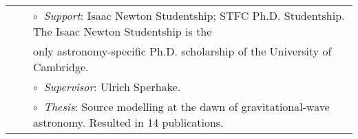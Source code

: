 \documentclass[letterpaper]{moderncv}
\begin{document}
\vspace{0.2cm}
\vspace{-0.1cm}
\begin{tabular}{rcl}
&\hspace{0.4cm} &$\circ\;\;${\textit{Support}}: Isaac Newton Studentship; STFC Ph.D. Studentship. The
Isaac Newton Studentship is the \\&\hspace{0.4cm} &  
\hspace{0.4cm}only astronomy-specific Ph.D. scholarship of the University of Cambridge.\\
&\hspace{0.4cm} &$\circ\;\;${\textit{Supervisor}}: Ulrich Sperhake.\\
&\hspace{0.4cm} &$\circ\;\;${\textit{Thesis}}: Source modelling at the dawn of gravitational-wave astronomy. Resulted in 14 publications.\\

\end{tabular}


\end{document}
